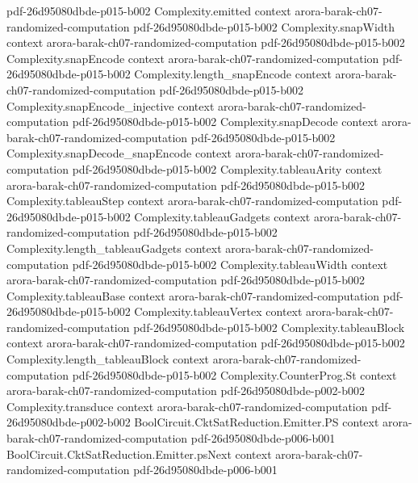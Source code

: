 \begin{theorem}
  {pdf-26d95080dbde-p015-b002}
\proofstep
  {Complexity.emitted}
  {context}
  {arora-barak-ch07-randomized-computation}
  {pdf-26d95080dbde-p015-b002}
\proofstep
  {Complexity.snapWidth}
  {context}
  {arora-barak-ch07-randomized-computation}
  {pdf-26d95080dbde-p015-b002}
\proofstep
  {Complexity.snapEncode}
  {context}
  {arora-barak-ch07-randomized-computation}
  {pdf-26d95080dbde-p015-b002}
\proofstep
  {Complexity.length_snapEncode}
  {context}
  {arora-barak-ch07-randomized-computation}
  {pdf-26d95080dbde-p015-b002}
\proofstep
  {Complexity.snapEncode_injective}
  {context}
  {arora-barak-ch07-randomized-computation}
  {pdf-26d95080dbde-p015-b002}
\proofstep
  {Complexity.snapDecode}
  {context}
  {arora-barak-ch07-randomized-computation}
  {pdf-26d95080dbde-p015-b002}
\proofstep
  {Complexity.snapDecode_snapEncode}
  {context}
  {arora-barak-ch07-randomized-computation}
  {pdf-26d95080dbde-p015-b002}
\proofstep
  {Complexity.tableauArity}
  {context}
  {arora-barak-ch07-randomized-computation}
  {pdf-26d95080dbde-p015-b002}
\proofstep
  {Complexity.tableauStep}
  {context}
  {arora-barak-ch07-randomized-computation}
  {pdf-26d95080dbde-p015-b002}
\proofstep
  {Complexity.tableauGadgets}
  {context}
  {arora-barak-ch07-randomized-computation}
  {pdf-26d95080dbde-p015-b002}
\proofstep
  {Complexity.length_tableauGadgets}
  {context}
  {arora-barak-ch07-randomized-computation}
  {pdf-26d95080dbde-p015-b002}
\proofstep
  {Complexity.tableauWidth}
  {context}
  {arora-barak-ch07-randomized-computation}
  {pdf-26d95080dbde-p015-b002}
\proofstep
  {Complexity.tableauBase}
  {context}
  {arora-barak-ch07-randomized-computation}
  {pdf-26d95080dbde-p015-b002}
\proofstep
  {Complexity.tableauVertex}
  {context}
  {arora-barak-ch07-randomized-computation}
  {pdf-26d95080dbde-p015-b002}
\proofstep
  {Complexity.tableauBlock}
  {context}
  {arora-barak-ch07-randomized-computation}
  {pdf-26d95080dbde-p015-b002}
\proofstep
  {Complexity.length_tableauBlock}
  {context}
  {arora-barak-ch07-randomized-computation}
  {pdf-26d95080dbde-p015-b002}
\proofstep
  {Complexity.CounterProg.St}
  {context}
  {arora-barak-ch07-randomized-computation}
  {pdf-26d95080dbde-p002-b002}
\proofstep
  {Complexity.transduce}
  {context}
  {arora-barak-ch07-randomized-computation}
  {pdf-26d95080dbde-p002-b002}
\proofstep
  {BoolCircuit.CktSatReduction.Emitter.PS}
  {context}
  {arora-barak-ch07-randomized-computation}
  {pdf-26d95080dbde-p006-b001}
\proofstep
  {BoolCircuit.CktSatReduction.Emitter.psNext}
  {context}
  {arora-barak-ch07-randomized-computation}
  {pdf-26d95080dbde-p006-b001}

\end{theorem}
